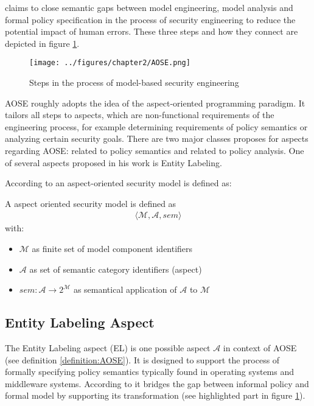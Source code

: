 \documentclass[twoside, openright, 12pt]{book}
\begin{document}
\cite{Amthor18} claims to close semantic gaps between model engineering, model analysis and formal policy specification in the process of security engineering to reduce the potential impact of human errors.
These three steps and how they connect are depicted in figure \ref{fig:AOSE}.

\begin{figure}[htb]
	\centering
	\texttt{[image: ../figures/chapter2/AOSE.png]}
	\caption{Steps in the process of model-based security engineering \citep{Amthor18}}
	\label{fig:AOSE}
\end{figure}

\noindent
AOSE roughly adopts the idea of the aspect-oriented programming paradigm.
It tailors all steps to aspects, which are non-functional requirements of the engineering process, for example determining requirements of policy semantics or analyzing certain security goals.
There are two major classes \cite{Amthor18} proposes for aspects regarding AOSE: related to policy semantics and related to policy analysis.
One of several aspects proposed in his work is Entity Labeling.

According to \cite{Amthor18} an aspect-oriented security model is defined as:

\begin{xdefinition} 
A aspect oriented security model is defined as 
\begin{gather*}
\langle \mathcal{M},\mathcal{A},sem \rangle
\end{gather*}
with:

\vspace{-2mm}
\begin{itemize}
\setlength\itemsep{0em}
\item $\mathcal{M}$ as finite set of model component identifiers
\item $\mathcal{A}$ as set of semantic category identifiers (aspect)
\item $sem : \mathcal{A} \rightarrow 2^\mathcal{M}$ as semantical application of $\mathcal{A}$ to $\mathcal{M}$
\end{itemize}
\label{definition:AOSE}
\end{xdefinition}



\subsection{Entity Labeling Aspect}
\label{EL}
The Entity Labeling aspect (EL) is one possible aspect $\mathcal{A}$ in context of AOSE (see definition \ref{definition:AOSE}).
It is designed to support the process of formally specifying policy semantics typically found in operating systems and middleware systems.
According to \cite{Amthor18} it bridges the gap between informal policy and formal model by supporting its transformation (see highlighted part in figure \ref{fig:AOSE}).
\end{document}
